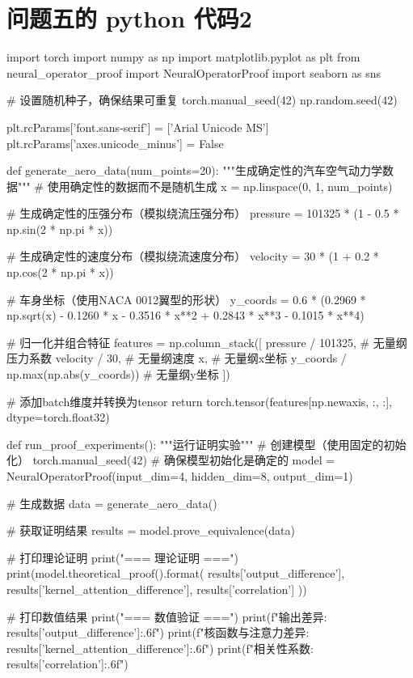 \documentclass{MMCStyle}
\begin{document}
 \section{问题五的 python 代码2}
  \begin{python}
import torch
import numpy as np
import matplotlib.pyplot as plt
from neural_operator_proof import NeuralOperatorProof
import seaborn as sns

# 设置随机种子，确保结果可重复
torch.manual_seed(42)
np.random.seed(42)

plt.rcParams['font.sans-serif'] = ['Arial Unicode MS']
plt.rcParams['axes.unicode_minus'] = False

def generate_aero_data(num_points=20):
    """生成确定性的汽车空气动力学数据"""
    # 使用确定性的数据而不是随机生成
    x = np.linspace(0, 1, num_points)
    
    # 生成确定性的压强分布（模拟绕流压强分布）
    pressure = 101325 * (1 - 0.5 * np.sin(2 * np.pi * x))
    
    # 生成确定性的速度分布（模拟绕流速度分布）
    velocity = 30 * (1 + 0.2 * np.cos(2 * np.pi * x))
    
    # 车身坐标（使用NACA 0012翼型的形状）
    y_coords = 0.6 * (0.2969 * np.sqrt(x) - 0.1260 * x - 
                      0.3516 * x**2 + 0.2843 * x**3 - 0.1015 * x**4)
    
    # 归一化并组合特征
    features = np.column_stack([
        pressure / 101325,  # 无量纲压力系数
        velocity / 30,      # 无量纲速度
        x,                  # 无量纲x坐标
        y_coords / np.max(np.abs(y_coords))  # 无量纲y坐标
    ])
    
    # 添加batch维度并转换为tensor
    return torch.tensor(features[np.newaxis, :, :], dtype=torch.float32)

def run_proof_experiments():
    """运行证明实验"""
    # 创建模型（使用固定的初始化）
    torch.manual_seed(42)  # 确保模型初始化是确定的
    model = NeuralOperatorProof(input_dim=4, hidden_dim=8, output_dim=1)
    
    # 生成数据
    data = generate_aero_data()
    
    # 获取证明结果
    results = model.prove_equivalence(data)
    
    # 打印理论证明
    print("\n=== 理论证明 ===")
    print(model.theoretical_proof().format(
        results['output_difference'],
        results['kernel_attention_difference'],
        results['correlation']
    ))
    
    # 打印数值结果
    print("\n=== 数值验证 ===")
    print(f"输出差异: {results['output_difference']:.6f}")
    print(f"核函数与注意力差异: {results['kernel_attention_difference']:.6f}")
    print(f"相关性系数: {results['correlation']:.6f}")
    

\end{python}
\end{document}
